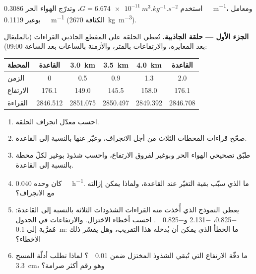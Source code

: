 \begin{problem}
\label{pb:b3:field-lab-methods-3:1}
استخدم $G = \qty{6.674e-11}{m^3.kg^{-1}.s^{-2}}$، وتدرّج الهواء الحر
\qty{0.3086}{\milli\gal.m^{-1}}، ومعامل بوغير
\qty{0.1119}{\milli\gal.m^{-1}} (الكثافة \qty{2670}{kg.m^{-3}}).

\medskip\noindent\textbf{الجزء الأول --- حلقة الجاذبية.} تُعطي الحلقة على
المقطع الجاذبي القراءات (بالمليغال بعد المعايرة، والارتفاعات بالمتر،
والأزمنة بالساعات بعد الساعة 09:00):
\begin{center}
\small
\begin{tabular}{lccccc}
\hline
المحطة & القاعدة & \qty{3.0}{km} & \qty{3.5}{km} & \qty{4.0}{km} & القاعدة \\
\hline
الزمن & 0 & 0.5 & 0.9 & 1.3 & 2.0 \\
الارتفاع & 176.1 & 149.0 & 145.5 & 158.0 & 176.1 \\
القراءة & 2846.512 & 2851.075 & 2850.497 & 2849.392 & 2846.708 \\
\hline
\end{tabular}
\end{center}
\begin{enumerate}
\item احسب معدّل انجراف الحلقة.
\item صحّح قراءات المحطات الثلاث من أجل الانجراف، وعبّر عنها
  بالنسبة إلى القاعدة.
\item طبّق تصحيحي الهواء الحر وبوغير لفروق الارتفاع،
  واحسب شذوذ بوغير لكلّ محطة بالنسبة إلى
  القاعدة.
\item كان  وحده \qty{0.040}{\milli\gal.h^{-1}}.
  ما الذي سبّب بقية التغيّر عند القاعدة، ولماذا يمكن
  إزالته مع الانجراف؟
\item يعطي النموذج الذي أُخذت منه القراءات الشذوذات الثلاثة
  بالنسبة إلى القاعدة: \num{-0.825}، \num{-2.131}
  و\qty{-0.825}{\milli\gal}. احسب أخطاء الاختزال. والارتفاعات
  في الجدول مُقرَّبة إلى \qty{0.1}{m}: ما الخطأ الذي يمكن أن يُدخله
  هذا التقريب، وهل يفسّر ذلك الأخطاء؟
\item ما دقّة الارتفاع التي تُبقي الشذوذ المختزل ضمن
  \qty{0.01}{\milli\gal}؟ لماذا تطلب أدلّة المسح
  \qty{3.3}{cm}، وهو رقم أكثر صرامة؟
\end{enumerate}


\end{problem}
